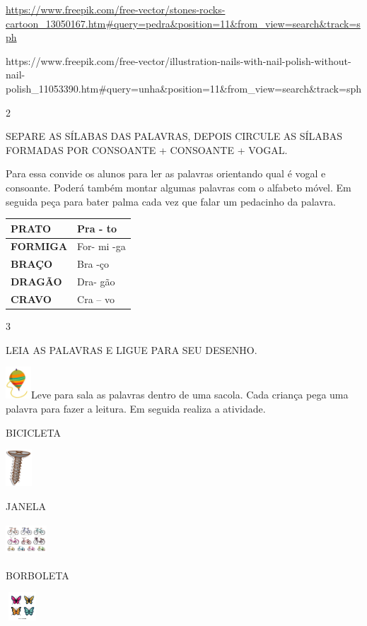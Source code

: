 {{\url{https://www.freepik.com/free-vector/stones-rocks-cartoon_13050167.htm\#query=pedra\&position=11\&from_view=search\&track=sph}

https://www.freepik.com/free-vector/illustration-nails-with-nail-polish-without-nail-polish\_11053390.htm\#query=unha\&position=11\&from\_view=search\&track=sph

\num{2}

SEPARE AS SÍLABAS DAS PALAVRAS, DEPOIS CIRCULE AS SÍLABAS FORMADAS POR
CONSOANTE + CONSOANTE + VOGAL.

Para essa convide os alunos para ler as palavras orientando qual é vogal
e consoante. Poderá também montar algumas palavras com o alfabeto móvel.
Em seguida peça para bater palma cada vez que falar um pedacinho da
palavra.

\begin{longtable}[]{@{}ll@{}}
\toprule
\textbf{PRATO} & Pra - to\tabularnewline
\midrule
\endhead
\textbf{FORMIGA} & For- mi -ga\tabularnewline
\textbf{BRAÇO} & Bra -ço\tabularnewline
\textbf{DRAGÃO} & Dra- gão\tabularnewline
\textbf{CRAVO} & Cra -- vo\tabularnewline
\bottomrule
\end{longtable}

\num{3}

LEIA AS PALAVRAS E LIGUE PARA SEU DESENHO.

\includegraphics[width=0.37431in,height=0.47083in]{media/image58.png}Leve
para sala as palavras dentro de uma sacola. Cada criança pega uma
palavra para fazer a leitura. Em seguida realiza a atividade.

BICICLETA

\includegraphics[width=0.38403in,height=0.53889in]{media/image59.png}

JANELA

\includegraphics[width=0.60069in,height=0.48056in]{media/image60.png}

BORBOLETA

\includegraphics[width=0.49028in,height=0.40833in]{media/image61.png}

}}
